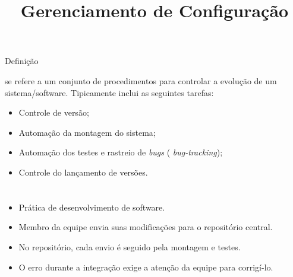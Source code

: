 \title{Gerenciamento de Configuração}

\frame{\maketitle}

\begin{frame}{\inserttitle}{Definição}

\inserttitle{} se refere a um conjunto de procedimentos para 
controlar a evolução de um sistema/software. Tipicamente inclui 
as seguintes tarefas:

\begin{itemize}[<+-| alert@+>]
\item Controle de versão;
\item Automação da montagem do sistema;
\item Automação dos testes e rastreio de {\em bugs} ({\em
  bug-tracking});
\item Controle do lançamento de versões.
\end{itemize}

\end{frame}


\section{\insertlecture}
\onlytitleframe{\insertlecture}


\section{\insertlecture}
\onlytitleframe{\insertlecture}

\begin{frame}{\insertlecture}
  
  \begin{itemize}[<+->]
  \item Prática de desenvolvimento de software.
  \item Membro da equipe envia suas modificações para o repositório central.
  \item No repositório, cada envio é seguido pela montagem e testes.
  \item O erro durante a integração exige a atenção da equipe para corrigí-lo.
  \end{itemize}
  
\end{frame}

